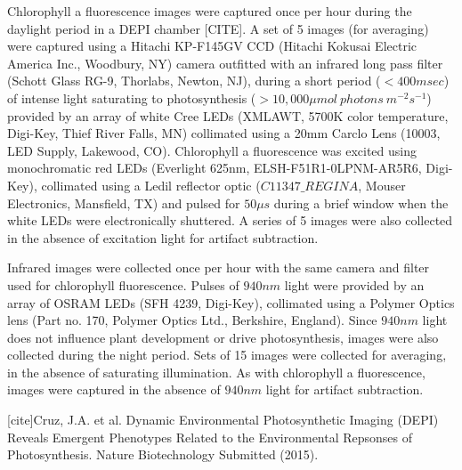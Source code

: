 Chlorophyll a fluorescence images were captured once per hour during the daylight period in a DEPI chamber [CITE].  A set of 5 images (for averaging) were captured using a Hitachi KP-F145GV CCD (Hitachi Kokusai Electric America Inc., Woodbury, NY)  camera outfitted with an infrared long pass filter (Schott Glass RG-9, Thorlabs, Newton, NJ), during a short period ($<400 msec$) of intense light saturating to photosynthesis ($>10,000 \mu mol~photons~m^{-2} s^{-1}$) provided by an array of white Cree LEDs (XMLAWT, 5700K color temperature, Digi-Key, Thief River Falls, MN) collimated using a 20mm Carclo Lens (10003, LED Supply, Lakewood, CO).
%
Chlorophyll a fluorescence was excited using monochromatic red LEDs (Everlight 625nm, ELSH-F51R1-0LPNM-AR5R6, Digi-Key), collimated using a Ledil reflector optic ($C11347\_REGINA$, Mouser Electronics, Mansfield, TX) and pulsed for $50 \mu s$ during a brief window when the white LEDs were electronically shuttered.  A series of 5 images were also collected in the absence of excitation light for artifact subtraction.

Infrared images were collected once per hour with the same camera and filter used for chlorophyll fluorescence.  Pulses of $940 nm$ light were provided by an array of OSRAM LEDs (SFH 4239, Digi-Key), collimated using a Polymer Optics lens (Part no. 170, Polymer Optics Ltd., Berkshire, England).  Since $940 nm$ light does not influence plant development or drive photosynthesis, images were also collected during the night period.  Sets of 15 images were collected for averaging, in the absence of saturating illumination.   As with chlorophyll a fluorescence, images were captured in the absence of $940 nm$ light for artifact subtraction.

[cite]Cruz, J.A. et al. Dynamic Environmental Photosynthetic Imaging (DEPI) Reveals Emergent Phenotypes Related to the Environmental Repsonses of Photosynthesis. Nature Biotechnology Submitted (2015).

